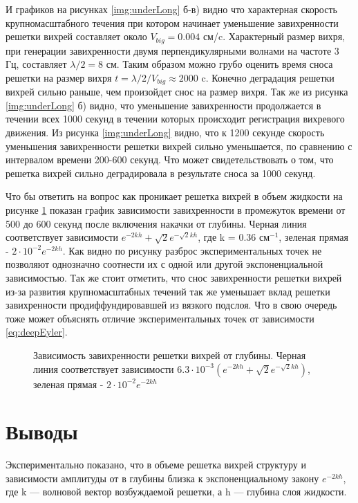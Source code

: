 И графиков на рисунках \ref{img:underLong} б-в) видно что характерная скорость крупномасштабного течения при котором начинает уменьшение завихренности решетки вихрей составляет около $V_{big} = 0.004$ см/c. Характерный размер вихря, при генерации завихренности двумя перпендикулярными волнами на частоте 3 Гц, составляет $\lambda/2 = 8$ см. Таким образом можно грубо оценить время сноса решетки на размер вихря $t=\lambda/2/V_{big} \approx 2000$ c. Конечно деградация решетки вихрей сильно раньше, чем произойдет снос на размер вихря. Так же из рисунка \ref{img:underLong} б) видно, что уменьшение завихренности продолжается в течении всех 1000 секунд в течении которых происходит регистрация вихревого движения. Из рисунка \ref{img:underLong} видно, что к 1200 секунде скорость уменьшения завихренности решетки вихрей сильно уменьшается, по сравнению с интервалом времени 200-600 секунд. Что может свидетельствовать о том, что решетка вихрей сильно деградировала в результате сноса за 1000 секунд.

Что бы ответить на вопрос как проникает решетка вихрей в объем жидкости на рисунке \ref{img:depth} показан график зависимости завихренности в промежуток времени от 500 до 600 секунд после включения накачки от глубины. Черная линия соответствует зависимости $e^{-2kh}+\sqrt{2}e^{-\sqrt{2}kh}$, где k = 0.36 см$^{-1}$, зеленая прямая - $2 \cdot 10^{-2} e^{-2kh}$. Как видно по рисунку разброс экспериментальных точек не позволяют однозначно соотнести их с одной или другой экспоненциальной зависимостью. Так же стоит отметить, что снос завихренности решетки вихрей из-за развития крупномасштабных течений так же уменьшает вклад решетки завихренности продиффундировавшей из вязкого подслоя. Что в свою очередь тоже может объяснять отличие экспериментальных точек от зависимости \ref{eq:deepEyler}.

\begin{figure}[ht]
  \caption{Зависимость завихренности решетки вихрей от глубины. Черная линия соответствует зависимости $6.3 \cdot 10^{-3} (e^{-2kh}+\sqrt{2}e^{-\sqrt{2}kh})$, зеленая прямая - $2 \cdot 10^{-2} e^{-2kh}$}
  \label{img:depth}  
\end{figure}


\section{Выводы} \label{sect6_5}
Экспериментально показано, что в объеме решетка вихрей структуру и зависимости амплитуды от в глубины близка к  экспоненциальному закону $e^{-2kh}$, где k — волновой вектор возбуждаемой решетки, а h — глубина слоя жидкости. 

